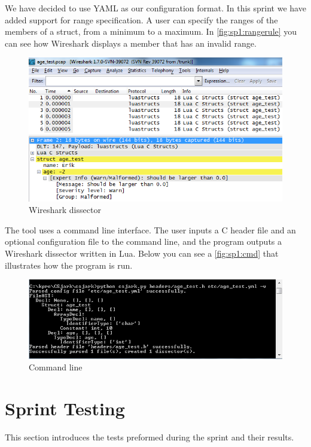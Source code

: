 We have decided to use YAML as our configuration format. In this sprint we have
added support for range specification. A user can specify the ranges of the
members of a struct, from a minimum to a maximum. In
\autoref{fig:sp1:rangerule} you can see how Wireshark displays a member that
has an invalid range. 

\begin{figure}[ht]
	\center
	\includegraphics[width=\textwidth]{./sprints/img/wireshark_outofrange.png}
	\caption{Wireshark dissector\label{fig:sp1:rangerule}}
\end{figure}

The tool uses a command line interface. The user inputs a C header file and
an optional configuration file to the command line, and the program outputs a
Wireshark dissector written in Lua. Below you can see a \autoref{fig:sp1:cmd}
that illustrates how the program is run.

\begin{figure}[ht]
	\includegraphics[width=\textwidth]{./sprints/img/cmd_agetest_run.png}
	\caption{Command line\label{fig:sp1:cmd}}
\end{figure}


\section{Sprint Testing}
This section introduces the tests preformed during the sprint and their
results.

